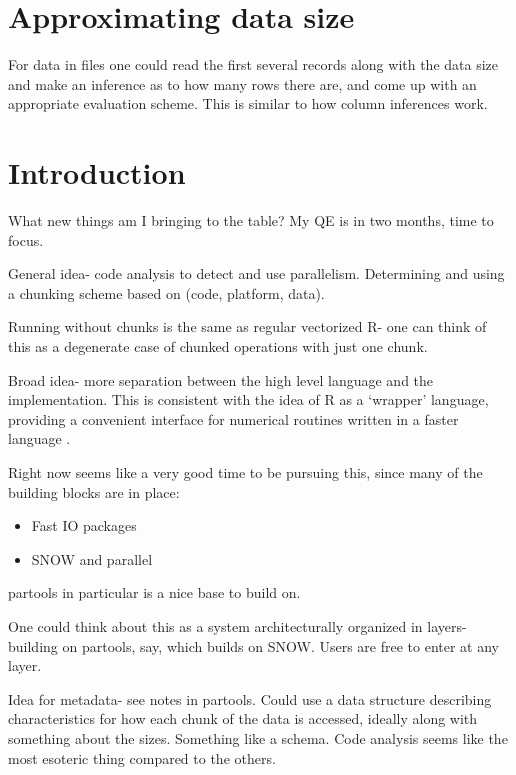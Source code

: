 \documentclass[12pt]{article}
\begin{document}
\section{Approximating data size}

For data in files one could read the first several records along with the
data size and make an inference as to how many rows there are, and come up
with an appropriate evaluation scheme. This is similar to how column
inferences work.

\section{Introduction}

What new things am I bringing to the table? My QE is in two months, time to
focus.

General idea- code analysis to detect and use parallelism. Determining and
using a chunking scheme based on (code, platform, data).

Running without chunks is the same as regular vectorized R- one can think
of this as a degenerate case of chunked operations with just one chunk.

Broad idea- more separation between the high level language
and the implementation. This is consistent with the idea of R as a `wrapper'
language, providing a convenient interface for numerical routines written
in a faster language \cite{chambers2016extending}.

Right now seems like a very good time to be pursuing this, since many of the
building blocks are in place:
\begin{itemize}
    \item Fast IO packages
    \item SNOW and parallel
\end{itemize}

partools in particular is a nice base to build on.

One could think about this as a system architecturally organized in layers- building on
partools, say, which builds on SNOW. Users are free to enter at any layer.

Idea for metadata- see notes in partools. Could use a data structure
describing characteristics for how each chunk of the data is accessed,
ideally along with something about the sizes. Something like a schema.
Code analysis seems like the most esoteric thing compared to the others.
\end{document}

